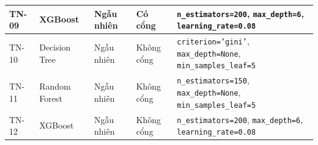 \begin{table}[htbp]
{\begin{tabular}{llll>{\raggedright\arraybackslash}p{7.5cm}}
TN-09 & XGBoost & Ngẫu nhiên & Có cổng & \texttt{n\_estimators=200}, \texttt{max\_depth=6}, \texttt{learning\_rate=0.08} \\
\midrule
TN-10 & Decision Tree & Ngẫu nhiên & Không cổng & \texttt{criterion='gini'}, \texttt{max\_depth=None}, \texttt{min\_samples\_leaf=5} \\
TN-11 & Random Forest & Ngẫu nhiên & Không cổng & \texttt{n\_estimators=150}, \texttt{max\_depth=None}, \texttt{min\_samples\_leaf=5} \\
TN-12 & XGBoost & Ngẫu nhiên & Không cổng & \texttt{n\_estimators=200}, \texttt{max\_depth=6}, \texttt{learning\_rate=0.08} \\
\bottomrule
\end{tabular}%
}
\end{table}
